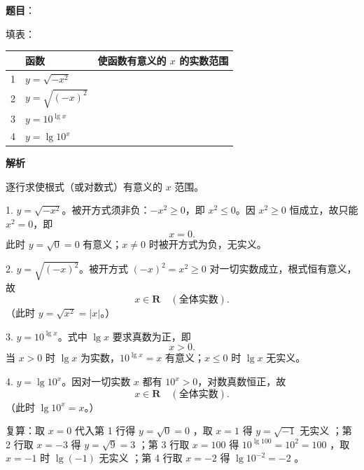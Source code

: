 \begin{answer}

\textbf{题目}：

填表：

\begin{center}
\begin{tabular}{cll}
\toprule
 & 函数 & 使函数有意义的 $x$ 的实数范围 \\
\midrule
1 & $y=\sqrt{-x^2}$ &  \\
2 & $y=\sqrt{(-x)^2}$ &  \\
3 & $y=10^{\lg x}$ &  \\
4 & $y=\lg 10^x$ &  \\
\bottomrule
\end{tabular}
\end{center}

\textbf{解析}

逐行求使根式（或对数式）有意义的 $x$ 范围。

1. $y=\sqrt{-x^2}$。被开方式须非负：$-x^2\ge0$，即 $x^2\le0$。因 $x^2\ge0$ 恒成立，故只能 $x^2=0$，即
\nopagebreak[4]
\[
x=0.
\]
此时 $y=\sqrt0=0$ 有意义；$x\ne0$ 时被开方式为负，无实义。

2. $y=\sqrt{(-x)^2}$。被开方式 $(-x)^2=x^2\ge0$ 对一切实数成立，根式恒有意义，故
\nopagebreak[4]
\[
x\in\mathbf{R}\quad(\text{全体实数}).
\]
（此时 $y=\sqrt{x^2}=\lvert x\rvert$。）

3. $y=10^{\lg x}$。式中 $\lg x$ 要求真数为正，即
\nopagebreak[4]
\[
x>0.
\]
当 $x>0$ 时 $\lg x$ 为实数，$10^{\lg x}=x$ 有意义；$x\le0$ 时 $\lg x$ 无实义。

4. $y=\lg 10^x$。因对一切实数 $x$ 都有 $10^x>0$，对数真数恒正，故
\nopagebreak[4]
\[
x\in\mathbf{R}\quad(\text{全体实数}).
\]
（此时 $\lg 10^x=x$。）

复算：取 $x=0$ 代入第 1 行得 $y=\sqrt0=0$ ，取 $x=1$ 得 $y=\sqrt{-1}$ 无实义 ；第 2 行取 $x=-3$ 得 $y=\sqrt9=3$ ；第 3 行取 $x=100$ 得 $10^{\lg100}=10^2=100$ ，取 $x=-1$ 时 $\lg(-1)$ 无实义 ；第 4 行取 $x=-2$ 得 $\lg 10^{-2}=-2$ 。


\end{answer}
